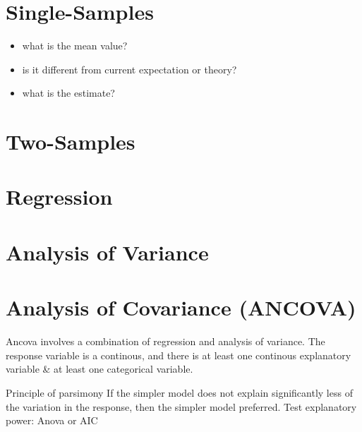 \documentclass[
  letterpaper,
  DIV=11,
  numbers=noendperiod]{scrreprt}
\providecommand{\tightlist}{%
  \setlength{\itemsep}{0pt}\setlength{\parskip}{0pt}}\usepackage{longtable,booktabs,array}
\begin{document}
\section*{Single-Samples}\label{single-samples}


\begin{itemize}
\tightlist
\item
  what is the mean value?
\item
  is it different from current expectation or theory?
\item
  what is the estimate?
\end{itemize}

\section*{Two-Samples}\label{two-samples}


\section*{Regression}\label{regression}


\section*{Analysis of Variance}\label{analysis-of-variance}


\section*{Analysis of Covariance
(ANCOVA)}\label{analysis-of-covariance-ancova}


Ancova involves a combination of regression and analysis of variance.
The response variable is a continous, and there is at least one
continous explanatory variable \& at least one categorical variable.

Principle of parsimony If the simpler model does not explain
significantly less of the variation in the response, then the simpler
model preferred. Test explanatory power: Anova or AIC
\end{document}
